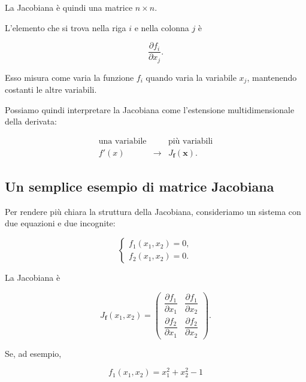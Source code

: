 La Jacobiana è quindi una matrice $n\times n$.

L'elemento che si trova nella riga $i$ e nella colonna $j$ è

\begin{equation*}
    \frac{\partial f_i}{\partial x_j}.
\end{equation*}

Esso misura come varia la funzione $f_i$ quando varia la variabile
$x_j$, mantenendo costanti le altre variabili.

Possiamo quindi interpretare la Jacobiana come l'estensione
multidimensionale della derivata:

\begin{equation*}
\begin{array}{ccc}
\text{una variabile}
&&
\text{più variabili}\\[1mm]
f'(x)
&\longrightarrow&
J_{\mathbf{f}}(\mathbf{x}).
\end{array}
\end{equation*}


\subsection{Un semplice esempio di matrice Jacobiana}

Per rendere più chiara la struttura della Jacobiana, consideriamo
un sistema con due equazioni e due incognite:

\begin{equation*}
\begin{cases}
f_1(x_1,x_2)=0,\\
f_2(x_1,x_2)=0.
\end{cases}
\end{equation*}

La Jacobiana è

\begin{equation*}
J_{\mathbf{f}}(x_1,x_2)
=
\begin{pmatrix}
\dfrac{\partial f_1}{\partial x_1}
&
\dfrac{\partial f_1}{\partial x_2}
\\[3mm]
\dfrac{\partial f_2}{\partial x_1}
&
\dfrac{\partial f_2}{\partial x_2}
\end{pmatrix}.
\end{equation*}

Se, ad esempio,

\begin{equation*}
    f_1(x_1,x_2)=x_1^2+x_2^2-1
\end{equation*}

